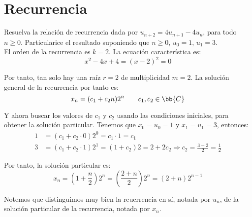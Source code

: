 \section{Recurrencia}



\begin{ejercicio}
    Resuelva la relación de recurrencia dada por $u_{n+2} = 4u_{n+1} - 4u_n$, para todo $n\geq 0$.
    Particularice el resultado suponiendo que $n\geq 0$, $u_0=1$, $u_1=3$.\\

    El orden de la recurrencia es $k=2$. La ecuación característica es:
    \begin{equation*}
        x^2-4x+4 = {(x-2)}^2=0
    \end{equation*}

    Por tanto, tan solo hay una raíz $r=2$ de multiplicidad $m=2$. La solución general de la recurrencia por tanto es:
    \begin{equation*}
        x_n = (c_1+c_2n)2^n \qquad c_1,c_2\in \bb{C}
    \end{equation*}

    Y ahora buscar los valores de $c_1$ y $c_2$ usando las condiciones iniciales, para obtener la solución particular.
    Tenemos que $x_0=u_0=1$ y $x_1=u_1=3$, entonces:
    \begin{align*}
        1 &= (c_1+c_2\cdot 0) 2^0 = c_1\cdot 1 = c_1\\
        3 &= (c_1+c_2\cdot 1) 2^1 = (1+c_2) 2 = 2+2c_2 \Longrightarrow c_2 = \frac{3-2}{2} = \frac{1}{2}
    \end{align*}

    Por tanto, la solución particular es:
    \begin{equation*}
        x_n = \left(1+\frac{n}{2}\right)2^n = \left(\frac{2+n}{2}\right)2^n = (2+n)2^{n-1}
    \end{equation*}
    \begin{observacion}
        Notemos que distinguimos muy bien la reucrrencia en sí, notada por $u_n$, de la solución particular de la recurrencia, notada por $x_n$.
    \end{observacion}
\end{ejercicio}

